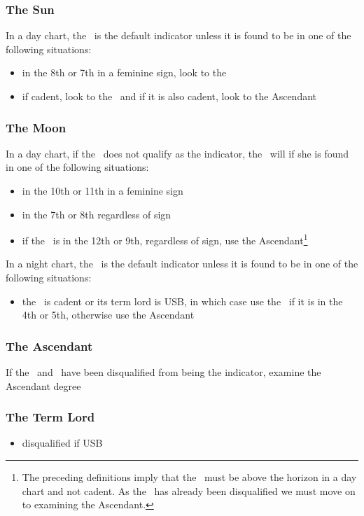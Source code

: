 \subsubsection{The Sun}
In a day chart, the \Sun\, is the default indicator unless it is found to be in one of the following situations:
\vspace{-0.5em}
\begin{itemize}[topsep=0em,itemsep=0em]
\item {}in the 8th or 7th in a feminine sign, look to the \Moon
\item {}if cadent, look to the \Moon\, and if it is also cadent, look to the Ascendant
\end{itemize}

\subsubsection{The Moon}
\vspace{-0.5em}
In a day chart, if the \Sun\, does not qualify as the indicator, the \Moon\, will if she is found in one of the following situations:
\begin{itemize}[topsep=0em,itemsep=0em]
\item {}in the 10th or 11th in a feminine sign
\item {}in the 7th or 8th regardless of sign
\item if the \Moon\, is in the 12th or 9th, regardless of sign, use the Ascendant\footnote{The preceding definitions imply that the \Moon\, must be above the horizon in a day chart and not cadent. As the \Sun\, has already been disqualified we must move on to examining the Ascendant.}
\end{itemize}

In a night chart, the \Moon\, is the default indicator unless it is found to be in one of the following situations:
\begin{itemize}[topsep=0em,itemsep=0em]
\item {}the \Moon\, is cadent or its term lord is USB, in which case use the \Sun\, if it is in the 4th or 5th, otherwise use the Ascendant
\end{itemize}

\subsubsection{The Ascendant}
If the \Sun\, and \Moon\, have been disqualified from being the indicator, examine the Ascendant degree
\vspace{-0.5em}

\subsubsection{The Term Lord}
\vspace{-0.5em}
\begin{itemize}[topsep=0em, itemsep=0em]
\item {}disqualified if USB
\end{itemize}

